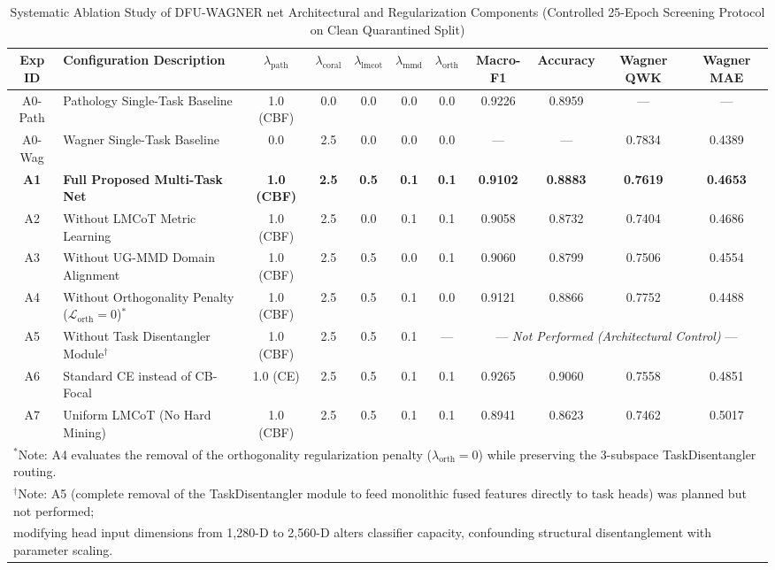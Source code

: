 \documentclass[journal]{IEEEtran}
\begin{document}
\begin{table}[t]
\centering
\caption{Systematic Ablation Study of DFU-WAGNER net Architectural and Regularization Components (Controlled 25-Epoch Screening Protocol on Clean Quarantined Split)}
\label{tab:ablation}
\begin{tabular}{clccccc@{\hspace{1.5em}}cccc}
\toprule
\textbf{Exp ID} & \textbf{Configuration Description} & $\lambda_{\text{path}}$ & $\lambda_{\text{coral}}$ & $\lambda_{\text{lmcot}}$ & $\lambda_{\text{mmd}}$ & $\lambda_{\text{orth}}$ & \textbf{Macro-F1} & \textbf{Accuracy} & \textbf{Wagner QWK} & \textbf{Wagner MAE} \\
\midrule
A0-Path & Pathology Single-Task Baseline & 1.0 (CBF) & 0.0 & 0.0 & 0.0 & 0.0 & 0.9226 & 0.8959 & --- & --- \\
A0-Wag & Wagner Single-Task Baseline & 0.0 & 2.5 & 0.0 & 0.0 & 0.0 & --- & --- & 0.7834 & 0.4389 \\
\textbf{A1} & \textbf{Full Proposed Multi-Task Net} & \textbf{1.0 (CBF)} & \textbf{2.5} & \textbf{0.5} & \textbf{0.1} & \textbf{0.1} & \textbf{0.9102} & \textbf{0.8883} & \textbf{0.7619} & \textbf{0.4653} \\
A2 & Without LMCoT Metric Learning & 1.0 (CBF) & 2.5 & 0.0 & 0.1 & 0.1 & 0.9058 & 0.8732 & 0.7404 & 0.4686 \\
A3 & Without UG-MMD Domain Alignment & 1.0 (CBF) & 2.5 & 0.5 & 0.0 & 0.1 & 0.9060 & 0.8799 & 0.7506 & 0.4554 \\
A4 & Without Orthogonality Penalty ($\mathcal{L}_{\text{orth}} = 0$)$^*$ & 1.0 (CBF) & 2.5 & 0.5 & 0.1 & 0.0 & 0.9121 & 0.8866 & 0.7752 & 0.4488 \\
A5 & Without Task Disentangler Module$^\dagger$ & 1.0 (CBF) & 2.5 & 0.5 & 0.1 & --- & \multicolumn{4}{c}{--- \textit{Not Performed (Architectural Control)} ---} \\
A6 & Standard CE instead of CB-Focal & 1.0 (CE) & 2.5 & 0.5 & 0.1 & 0.1 & 0.9265 & 0.9060 & 0.7558 & 0.4851 \\
A7 & Uniform LMCoT (No Hard Mining) & 1.0 (CBF) & 2.5 & 0.5 & 0.1 & 0.1 & 0.8941 & 0.8623 & 0.7462 & 0.5017 \\
\bottomrule
\multicolumn{11}{l}{\footnotesize $^*$Note: A4 evaluates the removal of the orthogonality regularization penalty ($\lambda_{\text{orth}}=0$) while preserving the 3-subspace TaskDisentangler routing.} \\
\multicolumn{11}{l}{\footnotesize $^\dagger$Note: A5 (complete removal of the TaskDisentangler module to feed monolithic fused features directly to task heads) was planned but not performed;} \\
\multicolumn{11}{l}{\footnotesize modifying head input dimensions from 1,280-D to 2,560-D alters classifier capacity, confounding structural disentanglement with parameter scaling.}
\end{tabular}
\end{table}
\end{document}
